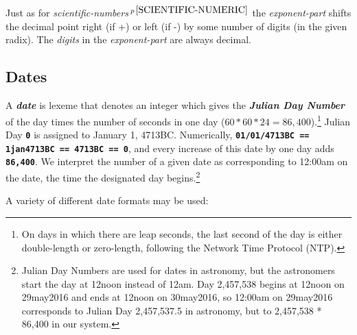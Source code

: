 \documentclass[12pt]{article}
\newcommand{\TT}[1]{{\tt \bfseries #1}}
\newcommand{\key}[1]{{\bf \em #1}\index{#1}}
\newcommand{\pagnote}[1]{$\,^{p\,\pageref{#1}}$}
\begin{document}
Just as for {\em scientific-numbers}\pagnote{SCIENTIFIC-NUMERIC}
the {\em exponent-part} shifts the decimal point right (if +) or left (if -)
by some number of digits (in the given radix).  The {\em digits}
in the {\em exponent-part} are always decimal.


\subsection{Dates}
\label{DATES}

A \key{date} is lexeme that denotes an integer
which gives the \key{Julian Day Number} of the day times
the number of seconds in one day ($60*60*24=86,400$).\footnote{
On days in which there are leap seconds, the last second of the
day is either double-length or zero-length, following the Network
Time Protocol (NTP).}  Julian Day \TT{0} is assigned to
January 1, 4713BC.
Numerically, \TT{01/01/4713BC == 1jan4713BC == 4713BC == 0}, and every increase
of this date by one day adds \TT{86,400}.  We interpret the number of
a given date as corresponding to 12:00am on the date, the time the designated
day begins.\footnote{Julian Day Numbers are used for dates in astronomy,
but the astronomers start the day at 12noon instead of 12am.
Day 2,457,538 begins at 12noon on 29may2016 and ends at 12noon on
30may2016, so
12:00am on 29may2016 corresponds to Julian Day 2,457,537.5 in astronomy,
but to 2,457,538 * 86,400 in our system.}

A variety of different date formats may be used:
\end{document}
